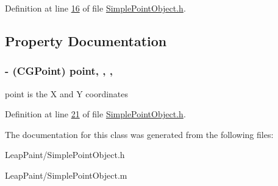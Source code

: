 Definition at line \hyperlink{_simple_point_object_8h_source_l00016}{16} of file \hyperlink{_simple_point_object_8h_source}{Simple\-Point\-Object.\-h}.



\subsection{Property Documentation}
\hypertarget{interface_simple_point_object_a9796a8e6a00e61bb255f59a80aef77d4}{
\subsubsection[{point}]{\setlength{\rightskip}{0pt plus 5cm}-\/ (C\-G\-Point) point\hspace{0.3cm}{\ttfamily [read]}, {\ttfamily [write]}, {\ttfamily [nonatomic]}, {\ttfamily [assign]}}}\label{d8/d8e/interface_simple_point_object_a9796a8e6a00e61bb255f59a80aef77d4}
point is the X and Y coordinates 

Definition at line \hyperlink{_simple_point_object_8h_source_l00021}{21} of file \hyperlink{_simple_point_object_8h_source}{Simple\-Point\-Object.\-h}.



The documentation for this class was generated from the following files\-:\begin{DoxyCompactItemize}
\item 
Leap\-Paint/Simple\-Point\-Object.\-h\item 
Leap\-Paint/Simple\-Point\-Object.\-m\end{DoxyCompactItemize}
